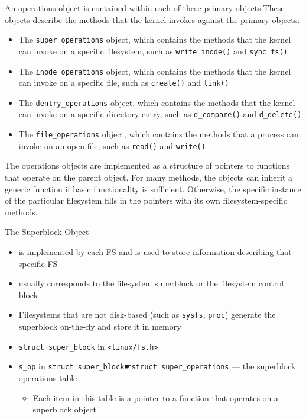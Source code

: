 An operations object is contained within each of these primary objects.These objects
describe the methods that the kernel invokes against the primary objects:
\begin{itemize}
\item The \verb|super_operations| object, which contains the methods that the kernel can
  invoke on a specific filesystem, such as \verb|write_inode()| and \verb|sync_fs()|
\item The \verb|inode_operations| object, which contains the methods that the kernel can
  invoke on a specific file, such as \texttt{create()} and \texttt{link()}
\item The \verb|dentry_operations| object, which contains the methods that the kernel can
  invoke on a specific directory entry, such as \verb|d_compare()| and \verb|d_delete()|
\item The \verb|file_operations| object, which contains the methods that a process can
  invoke on an open file, such as \texttt{read()} and \texttt{write()}
\end{itemize}
  The operations objects are implemented as a structure of pointers to functions that
  operate on the parent object. For many methods, the objects can inherit a generic
  function if basic functionality is sufficient. Otherwise, the specific instance of the
  particular filesystem fills in the pointers with its own filesystem-specific methods.

\begin{frame}
  \begin{block}{The Superblock Object}
    \begin{itemize}
    \item is implemented by each FS and is used to store information describing that
      specific FS
    \item usually corresponds to the \alert{filesystem superblock} or the \alert{filesystem
        control block}
    \item Filesystems that are not disk-based (such as \texttt{sysfs}, \texttt{proc}) generate
      the superblock on-the-fly and store it in memory
    \item \texttt{struct super\_block} in \texttt{<linux/fs.h>}
    \item \texttt{s\_op} in \texttt{struct super\_block}{☛}\texttt{struct
        super\_operations} --- the superblock operations table
      \begin{itemize}
      \item Each item in this table is a pointer to a function that operates on a
        superblock object
      \end{itemize}
    \end{itemize}
  \end{block}
\end{frame}

